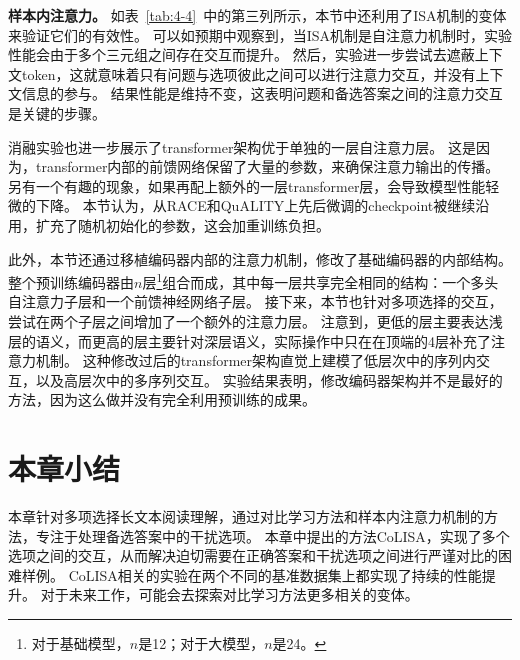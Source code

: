 \noindent \textbf{样本内注意力。}
如表~\ref{tab:4-4}~中的第三列所示，本节中还利用了ISA机制的变体来验证它们的有效性。
可以如预期中观察到，当ISA机制是自注意力机制时，实验性能会由于多个三元组之间存在交互而提升。
然后，实验进一步尝试去遮蔽上下文token，这就意味着只有问题与选项彼此之间可以进行注意力交互，并没有上下文信息的参与。
结果性能是维持不变，这表明问题和备选答案之间的注意力交互是关键的步骤。

消融实验也进一步展示了transformer架构优于单独的一层自注意力层。
这是因为，transformer内部的前馈网络保留了大量的参数，来确保注意力输出的传播。
另有一个有趣的现象，如果再配上额外的一层transformer层，会导致模型性能轻微的下降。
本节认为，从RACE和QuALITY上先后微调的checkpoint被继续沿用，扩充了随机初始化的参数，这会加重训练负担。

此外，本节还通过移植编码器内部的注意力机制，修改了基础编码器的内部结构。
整个预训练编码器由$n$层\footnote{对于基础模型，$n$是12；对于大模型，$n$是24。}组合而成，其中每一层共享完全相同的结构：一个多头自注意力子层和一个前馈神经网络子层。
接下来，本节也针对多项选择的交互，尝试在两个子层之间增加了一个额外的注意力层。
注意到，更低的层主要表达浅层的语义，而更高的层主要针对深层语义，实际操作中只在在顶端的4层补充了注意力机制。
这种修改过后的transformer架构直觉上建模了低层次中的序列内交互，以及高层次中的多序列交互。
实验结果表明，修改编码器架构并不是最好的方法，因为这么做并没有完全利用预训练的成果。


\section{本章小结}
本章针对多项选择长文本阅读理解，通过对比学习方法和样本内注意力机制的方法，专注于处理备选答案中的干扰选项。
本章中提出的方法CoLISA，实现了多个选项之间的交互，从而解决迫切需要在正确答案和干扰选项之间进行严谨对比的困难样例。
CoLISA相关的实验在两个不同的基准数据集上都实现了持续的性能提升。
对于未来工作，可能会去探索对比学习方法更多相关的变体。


